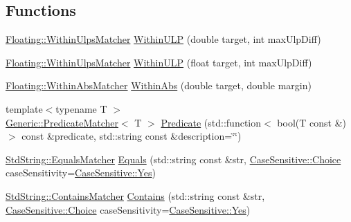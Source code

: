 \subsection*{Functions}
\begin{DoxyCompactItemize}
\item 
\hyperlink{struct_catch_1_1_matchers_1_1_floating_1_1_within_ulps_matcher}{Floating\-::\-Within\-Ulps\-Matcher} \hyperlink{namespace_catch_1_1_matchers_ae895591bd78a7d0ce4cdf3cf40d89ab5}{Within\-U\-L\-P} (double target, int max\-Ulp\-Diff)
\item 
\hyperlink{struct_catch_1_1_matchers_1_1_floating_1_1_within_ulps_matcher}{Floating\-::\-Within\-Ulps\-Matcher} \hyperlink{namespace_catch_1_1_matchers_ab87ee77e5349fac450d1e631dee86496}{Within\-U\-L\-P} (float target, int max\-Ulp\-Diff)
\item 
\hyperlink{struct_catch_1_1_matchers_1_1_floating_1_1_within_abs_matcher}{Floating\-::\-Within\-Abs\-Matcher} \hyperlink{namespace_catch_1_1_matchers_a4c9ea76d47d02de0cf2d354c87c26e95}{Within\-Abs} (double target, double margin)
\item 
{\footnotesize template$<$typename T $>$ }\\\hyperlink{class_catch_1_1_matchers_1_1_generic_1_1_predicate_matcher}{Generic\-::\-Predicate\-Matcher}$<$ T $>$ \hyperlink{namespace_catch_1_1_matchers_a034f2de6c0aac6f4a662fdf2558aedce}{Predicate} (std\-::function$<$ bool(T const \&)$>$ const \&predicate, std\-::string const \&description=\char`\"{}\char`\"{})
\item 
\hyperlink{struct_catch_1_1_matchers_1_1_std_string_1_1_equals_matcher}{Std\-String\-::\-Equals\-Matcher} \hyperlink{namespace_catch_1_1_matchers_af8af7dfc338335ed4c788cb1b37fc59f}{Equals} (std\-::string const \&str, \hyperlink{struct_catch_1_1_case_sensitive_aad49d3aee2d97066642fffa919685c6a}{Case\-Sensitive\-::\-Choice} case\-Sensitivity=\hyperlink{struct_catch_1_1_case_sensitive_aad49d3aee2d97066642fffa919685c6aa7c5550b69ec3c502e6f609b67f9613c6}{Case\-Sensitive\-::\-Yes})
\item 
\hyperlink{struct_catch_1_1_matchers_1_1_std_string_1_1_contains_matcher}{Std\-String\-::\-Contains\-Matcher} \hyperlink{namespace_catch_1_1_matchers_a1f6c2accdc6cd75a84d7112dcad647b4}{Contains} (std\-::string const \&str, \hyperlink{struct_catch_1_1_case_sensitive_aad49d3aee2d97066642fffa919685c6a}{Case\-Sensitive\-::\-Choice} case\-Sensitivity=\hyperlink{struct_catch_1_1_case_sensitive_aad49d3aee2d97066642fffa919685c6aa7c5550b69ec3c502e6f609b67f9613c6}{Case\-Sensitive\-::\-Yes})

\end{DoxyCompactItemize}
